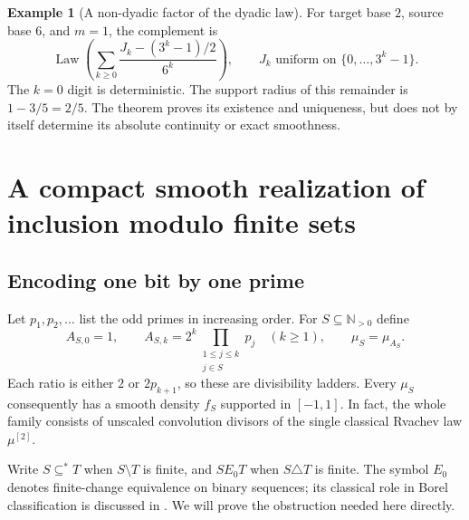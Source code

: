 \documentclass[11pt,a4paper]{article}
\theoremstyle{definition}
\newtheorem{example}[theorem]{Example}
\theoremstyle{remark}
\newcommand{\N}{\mathbb N}
\newcommand{\Law}{\operatorname{Law}}
\newcommand{\Mu}[1]{\mu^{[#1]}}
\begin{document}
\begin{example}[A non-dyadic factor of the dyadic law]
For target base $2$, source base $6$, and $m=1$, the complement is
\[
 \Law\left(\sum_{k\ge0}
 \frac{J_k-(3^k-1)/2}{6^k}\right),\qquad
 J_k\text{ uniform on }\{0,\ldots,3^k-1\}.
\]
The $k=0$ digit is deterministic. The support radius of this remainder is
$1-3/5=2/5$. The theorem proves its existence and uniqueness, but does not
by itself determine its absolute continuity or exact smoothness.
\end{example}

\section{A compact smooth realization of inclusion modulo finite sets}
\label{sec:boolean}

\subsection{Encoding one bit by one prime}
Let $p_1,p_2,\ldots$ list the odd primes in increasing order.
For $S\subseteq\N_{>0}$ define
\begin{equation}\label{eq:boolean-ladder}
 A_{S,0}=1,\qquad
 A_{S,k}=2^k\prod_{\substack{1\le j\le k\\j\in S}}p_j\quad(k\ge1),
 \qquad \mu_S=\mu_{A_S}.
\end{equation}
Each ratio is either $2$ or $2p_{k+1}$, so these are divisibility ladders.
Every $\mu_S$ consequently has a smooth density $f_S$ supported in $[-1,1]$.
In fact, the whole family consists of unscaled convolution divisors of the
single classical Rvachev law $\Mu2$.

Write $S\subseteq^*T$ when $S\setminus T$ is finite, and $S\mathrel{E_0}T$
when $S\triangle T$ is finite. The symbol $E_0$ denotes finite-change
 equivalence on binary sequences; its classical role in Borel
classification is discussed in \cite{hkl}. We will prove the obstruction
needed here directly.
\end{document}
